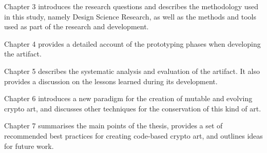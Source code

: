 Chapter 3 introduces the research questions and describes the methodology used in this study, namely Design Science Research, as well as the methods and tools used as part of the research and development.

Chapter 4 provides a detailed account of the prototyping phases when developing the artifact.

Chapter 5 describes the systematic analysis and evaluation of the artifact. It also provides a discussion on the lessons learned during its development.

Chapter 6 introduces a new paradigm for the creation of mutable and evolving crypto art, and discusses other techniques for the conservation of this kind of art.

Chapter 7 summarises the main points of the thesis, provides a set of recommended best practices for creating code-based crypto art, and outlines ideas for future work.
